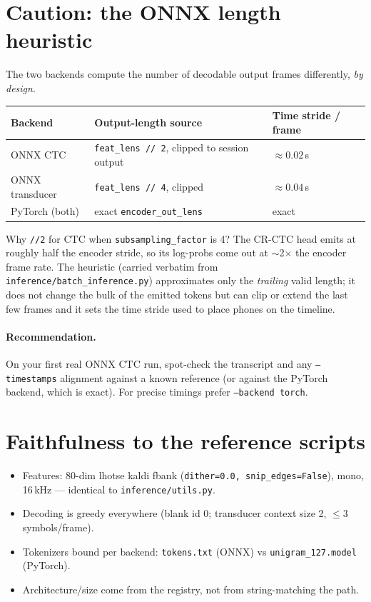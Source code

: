 \documentclass[11pt,a4paper]{article}
\newcommand{\code}[1]{\texttt{#1}}
\begin{document}
\section{Caution: the ONNX length heuristic}\label{sec:caution}
The two backends compute the number of decodable output frames differently,
\emph{by design}.

\begin{longtable}{@{}lll@{}}
\toprule
\textbf{Backend} & \textbf{Output-length source} & \textbf{Time stride / frame} \\
\midrule
\endhead
ONNX CTC        & \code{feat\_lens // 2}, clipped to session output & $\approx 0.02$\,s \\
ONNX transducer & \code{feat\_lens // 4}, clipped                   & $\approx 0.04$\,s \\
PyTorch (both)  & exact \code{encoder\_out\_lens}                   & exact \\
\bottomrule
\end{longtable}

Why \code{//2} for CTC when \code{subsampling\_factor} is 4? The CR-CTC head emits at
roughly half the encoder stride, so its log-probs come out at $\sim$2$\times$ the
encoder frame rate. The heuristic (carried verbatim from
\code{inference/batch\_inference.py}) approximates only the \emph{trailing} valid
length; it does not change the bulk of the emitted tokens but can clip or extend the
last few frames and it sets the time stride used to place phones on the timeline.

\paragraph{Recommendation.} On your first real ONNX CTC run, spot-check the
transcript and any \code{--timestamps} alignment against a known reference (or against
the PyTorch backend, which is exact). For precise timings prefer \code{--backend torch}.

\section{Faithfulness to the reference scripts}
\begin{itemize}[nosep]
  \item Features: 80-dim lhotse kaldi fbank (\code{dither=0.0, snip\_edges=False}),
        mono, 16\,kHz --- identical to \code{inference/utils.py}.
  \item Decoding is greedy everywhere (blank id 0; transducer context size 2, $\le$3
        symbols/frame).
  \item Tokenizers bound per backend: \code{tokens.txt} (ONNX) vs
        \code{unigram\_127.model} (PyTorch).
  \item Architecture/size come from the registry, not from string-matching the path.
\end{itemize}
\end{document}
